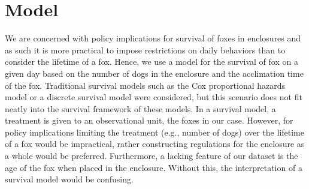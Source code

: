 \documentclass[aoas,preprint]{imsart}
\numberwithin{equation}{section}
\theoremstyle{plain}
\begin{document}
\section{Model} 
We are concerned with policy implications for survival of foxes in enclosures and as such it is more practical to impose restrictions on daily behaviors than to consider the lifetime of a fox. Hence, we use a model for the survival of fox on a given day based on the number of dogs in the enclosure and the acclimation time of the fox. Traditional survival models such as the Cox proportional hazards model \citep{cox} or a discrete survival model were considered, but this scenario does not fit neatly into the survival framework \citep{klein} of these models. In a survival model, a treatment is given to an observational unit, the foxes in our case. However, for policy implications limiting the treatment (e.g., number of dogs) over the lifetime of a fox would be impractical, rather constructing regulations for the enclosure as a whole would be preferred. Furthermore, a lacking feature of our dataset is the age of the fox when placed in the enclosure. Without this, the interpretation of a survival model would be confusing.
\end{document}
